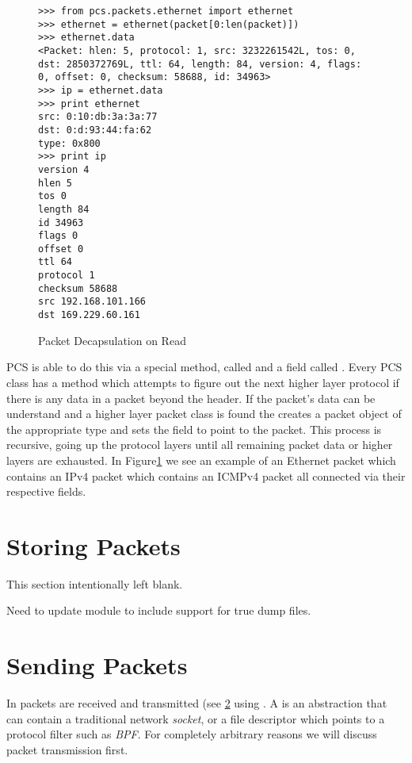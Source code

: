 \documentclass[11pt]{article}
\begin{document}
\begin{figure}
  \centering
\begin{lstlisting}
>>> from pcs.packets.ethernet import ethernet
>>> ethernet = ethernet(packet[0:len(packet)])
>>> ethernet.data
<Packet: hlen: 5, protocol: 1, src: 3232261542L, tos: 0, dst: 2850372769L, ttl: 64, length: 84, version: 4, flags: 0, offset: 0, checksum: 58688, id: 34963>
>>> ip = ethernet.data
>>> print ethernet
src: 0:10:db:3a:3a:77
dst: 0:d:93:44:fa:62
type: 0x800
>>> print ip
version 4
hlen 5
tos 0
length 84
id 34963
flags 0
offset 0
ttl 64
protocol 1
checksum 58688
src 192.168.101.166
dst 169.229.60.161
\end{lstlisting}
  \caption{Packet Decapsulation on Read}
  \label{fig:packet-decapsulation-on-read}
\end{figure}

PCS is able to do this via a special method, called  and
a field called .  Every PCS class has a 
method which attempts to figure out the next higher layer protocol if
there is any data in a packet beyond the header.  If the packet's data
can be understand and a higher layer packet class is found the
 creates a packet object of the appropriate type and
sets the  field to point to the packet.  This process is
recursive, going up the protocol layers until all remaining packet
data or higher layers are exhausted.  In
Figure\ref{fig:packet-decapsulation-on-read} we see an example of an
Ethernet packet which contains an IPv4 packet which contains an ICMPv4
packet all connected via their respective  fields.

\section{Storing Packets}

This section intentionally left blank.

Need to update  module to include support for true dump
files.

\section{Sending Packets}
\label{sec:sending-packets}

In  packets are received and transmitted (see
\ref{sec:sending-packets} using .  A
 is an abstraction that can contain a traditional
network \emph{socket}, or a file descriptor which points to a protocol
filter such as \emph{BPF}.  For completely arbitrary reasons we will
discuss packet transmission first.
\end{document}
